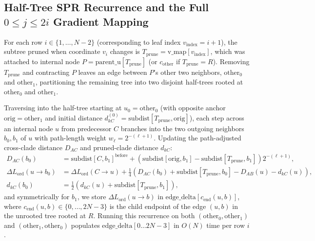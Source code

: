 \documentclass[11pt,a4paper]{article}
\theoremstyle{definition}
\begin{document}
\subsection{Half-Tree SPR Recurrence and the Full $0 \le j \le 2i$ Gradient Mapping}

For each row $i \in \{1, \dots, N-2\}$ (corresponding to leaf index $v_{\text{index}} = i + 1$), the subtree pruned when coordinate $v_i$ changes is $T_{\text{prune}} = \text{v\_map}[v_{\text{index}}]$, which was attached to internal node $P = \text{parent\_u}[T_{\text{prune}}]$ (or $c_{\text{other}}$ if $T_{\text{prune}} = R$). Removing $T_{\text{prune}}$ and contracting $P$ leaves an edge between $P$'s other two neighbors, $\text{other}_0$ and $\text{other}_1$, partitioning the remaining tree into two disjoint half-trees rooted at $\text{other}_0$ and $\text{other}_1$.

Traversing into the half-tree starting at $u_0 = \text{other}_0$ (with opposite anchor $\text{orig} = \text{other}_1$ and initial distance $d_{kC}^{(0)} = \text{subdist}[T_{\text{prune}}, \text{orig}]$), each step across an internal node $u$ from predecessor $C$ branches into the two outgoing neighbors $b_0, b_1$ of $u$ with path-length weight $w_\ell = 2^{-(\ell + 1)}$. Updating the path-adjusted cross-clade distance $D_{AC}$ and pruned-clade distance $d_{kC}$:
\begin{align}
D_{AC}(b_0) &= \text{subdist}[C, b_1]^{\text{before}} + \left(\text{subdist}[\text{orig}, b_1] - \text{subdist}[T_{\text{prune}}, b_1]\right) 2^{-(\ell+1)}, \nonumber \\
\Delta L_{\text{ord}}(u \to b_0) &= \Delta L_{\text{ord}}(C \to u) + \frac{1}{4}\left(D_{AC}(b_0) + \text{subdist}[T_{\text{prune}}, b_0] - D_{AB}(u) - d_{kC}(u)\right), \nonumber \\
d_{kC}(b_0) &= \frac{1}{2}\left(d_{kC}(u) + \text{subdist}[T_{\text{prune}}, b_1]\right),
\label{eq:spr_recurrence}
\end{align}
and symmetrically for $b_1$, we store $\Delta L_{\text{ord}}(u \to b)$ in $\text{edge\_delta}[c_{\text{end}}(u, b)]$, where $c_{\text{end}}(u, b) \in \{0, \dots, 2N-3\}$ is the child endpoint of the edge $(u, b)$ in the unrooted tree rooted at $R$. Running this recurrence on both $(\text{other}_0, \text{other}_1)$ and $(\text{other}_1, \text{other}_0)$ populates $\text{edge\_delta}[0 \dots 2N-3]$ in $O(N)$ time per row $i$.
\end{document}
